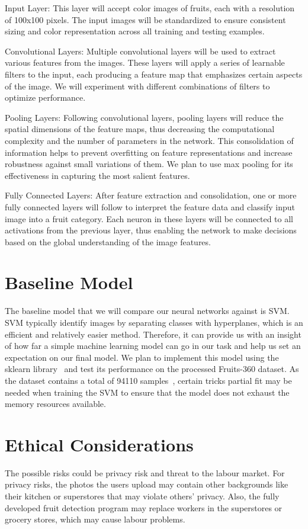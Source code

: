 \documentclass{article} %
\begin{document}
Input Layer: This layer will accept color images of fruits, each with a resolution of 100x100 pixels. The input images will be standardized to ensure consistent sizing and color representation across all training and testing examples.

Convolutional Layers: Multiple convolutional layers will be used to extract various features from the images. These layers will apply a series of learnable filters to the input, each producing a feature map that emphasizes certain aspects of the image. We will experiment with different combinations of filters to optimize performance.

Pooling Layers: Following convolutional layers, pooling layers will reduce the spatial dimensions of the feature maps, thus decreasing the computational complexity and the number of parameters in the network. This consolidation of information helps to prevent overfitting on feature representations and increase robustness against small variations of them. We plan to use max pooling for its effectiveness in capturing the most salient features.

Fully Connected Layers: After feature extraction and consolidation, one or more fully connected layers will follow to interpret the feature data and classify input image into a fruit category. Each neuron in these layers will be connected to all activations from the previous layer, thus enabling the network to make decisions based on the global understanding of the image features.

\section{Baseline Model}
The baseline model that we will compare our neural networks against is SVM. SVM typically identify images by separating classes with hyperplanes, which is an efficient and relatively easier method. Therefore, it can provide us with an insight of how far a simple machine learning model can go in our task and help us set an expectation on our final model. We plan to implement this model using the sklearn library~\citep{sklearn_api} and test its performance on the processed Fruits-360 dataset. As the dataset contains a total of 94110 samples~\citep{moltean_fruits_360}, certain tricks partial fit may be needed when training the SVM to ensure that the model does not exhaust the memory resources available. 

\section{Ethical Considerations}
The possible risks could be privacy risk and threat to the labour market. For privacy risks, the photos the users upload may contain other backgrounds like their kitchen or superstores that may violate others’ privacy. Also, the fully developed fruit detection program may replace workers in the superstores or grocery stores, which may cause labour problems.
\end{document}
